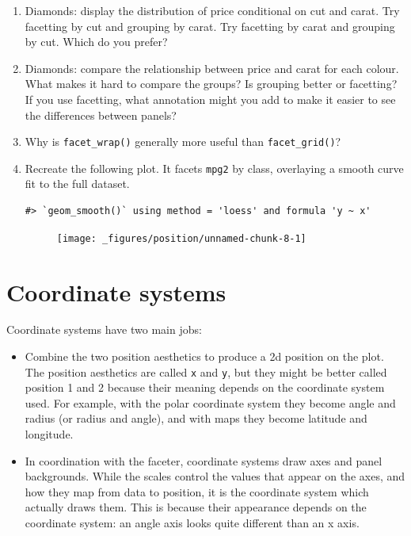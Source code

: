 \begin{enumerate}
\def\labelenumi{\arabic{enumi}.}
\item
  Diamonds: display the distribution of price conditional on cut and
  carat. Try facetting by cut and grouping by carat. Try facetting by
  carat and grouping by cut. Which do you prefer?
\item
  Diamonds: compare the relationship between price and carat for each
  colour. What makes it hard to compare the groups? Is grouping better
  or facetting? If you use facetting, what annotation might you add to
  make it easier to see the differences between panels?
\item
  Why is \texttt{facet\_wrap()} generally more useful than
  \texttt{facet\_grid()}?
\item
  Recreate the following plot. It facets \texttt{mpg2} by class,
  overlaying a smooth curve fit to the full dataset.

\begin{verbatim}
#> `geom_smooth()` using method = 'loess' and formula 'y ~ x'
\end{verbatim}

  \begin{figure}[H]
    \centering
    \texttt{[image: \_figures/position/unnamed-chunk-8-1]}
  \end{figure}
\end{enumerate}

\hypertarget{sec:coord}{%
\section{Coordinate systems}\label{sec:coord}}

Coordinate systems have two main jobs: 

\begin{itemize}
\item
  Combine the two position aesthetics to produce a 2d position on the
  plot. The position aesthetics are called \texttt{x} and \texttt{y},
  but they might be better called position 1 and 2 because their meaning
  depends on the coordinate system used. For example, with the polar
  coordinate system they become angle and radius (or radius and angle),
  and with maps they become latitude and longitude.
\item
  In coordination with the faceter, coordinate systems draw axes and
  panel backgrounds. While the scales control the values that appear on
  the axes, and how they map from data to position, it is the coordinate
  system which actually draws them. This is because their appearance
  depends on the coordinate system: an angle axis looks quite different
  than an x axis.
\end{itemize}

